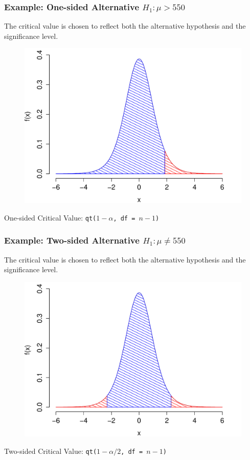 \documentclass[handout]{beamer}
\begin{document}
\begin{frame}
\frametitle{Example: One-sided Alternative $H_1\colon \mu > 550$}
The critical value is chosen to reflect both the alternative hypothesis and the significance level. 
\begin{figure}
\includegraphics[scale = 0.45]{./images/one_side}
\end{figure}
One-sided Critical Value: \texttt{qt($1-\alpha$, df  = $n-1$)}
\end{frame}



\begin{frame}
\frametitle{Example: Two-sided Alternative $H_1\colon \mu \neq 550$}
The critical value is chosen to reflect both the alternative hypothesis and the significance level. 
\begin{figure}
\includegraphics[scale = 0.45]{./images/two_side}
\end{figure}
Two-sided Critical Value: \texttt{qt($1-\alpha/2$, df  = $n-1$)}
\end{frame}
\end{document}
